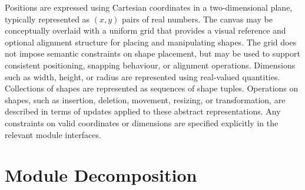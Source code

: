 \documentclass[12pt, titlepage]{article}
\begin{document}
\noindent
Positions are expressed using Cartesian coordinates in a two-dimensional plane,
typically represented as $(x, y)$ pairs of real numbers. The canvas may be
conceptually overlaid with a uniform grid that provides a visual reference and
optional alignment structure for placing and manipulating shapes. The grid does
not impose semantic constraints on shape placement, but may be used to support
consistent positioning, snapping behaviour, or alignment operations. Dimensions
such as width, height, or radius are represented using real-valued quantities.
Collections of shapes are represented as sequences of shape tuples. Operations
on shapes, such as insertion, deletion, movement, resizing, or transformation,
are described in terms of updates applied to these abstract representations.
Any constraints on valid coordinates or dimensions are specified explicitly in
the relevant module interfaces.

\section{Module Decomposition}

\end{document}
